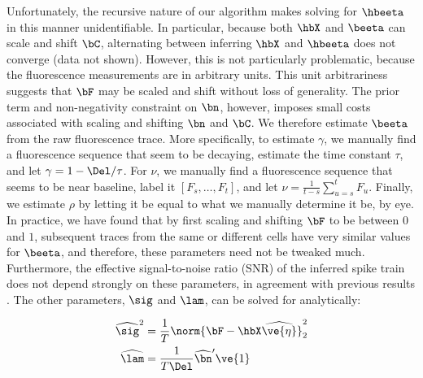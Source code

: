 Unfortunately, the recursive nature of our algorithm makes solving for $\hbeeta$ in this manner unidentifiable. In particular, because both $\hbX$ and $\beeta$ can scale and shift $\bC$, alternating between inferring $\hbX$ and $\hbeeta$ does not converge (data not shown). However, this is not particularly problematic, because the fluorescence measurements are in arbitrary units. This unit arbitrariness suggests that $\bF$ may be scaled and shift without loss of generality. The prior term and non-negativity constraint on $\bn$, however, imposes small costs associated with scaling and shifting $\bn$ and $\bC$.  We therefore estimate $\beeta$ from the raw fluorescence trace.  More specifically, to estimate $\gamma$, we manually find a fluorescence sequence that seem to be decaying, estimate the time constant $\tau$, and let $\gamma=1-\Del/\tau$.  For $\nu$, we manually find a fluorescence sequence that seems to be near baseline, label it $[F_s,\ldots, F_t]$, and let $\nu=\frac{1}{t-s}\sum_{u=s}^t F_u$.  Finally, we estimate $\rho$ by letting it be equal to what we manually determine it be, by eye.  In practice, we have found that by first scaling and shifting $\bF$ to be between $0$ and $1$, subsequent traces from the same or different cells have very similar values for $\beeta$, and therefore, these parameters need not be tweaked much.  Furthermore, the effective signal-to-noise ratio (SNR) of the inferred spike train does not depend strongly on these parameters, in agreement with previous results \cite{YaksiFriedrich06}.  The other parameters, $\sig$ and $\lam$, can be solved for analytically:

\begin{align} 
\widehat{\sig}^2 &= \frac{1}{T} \norm{\bF - \hbX \widehat{\ve{\eta}}}_2^2 \label{eq:sig2}\\
\widehat{\lam} &=  \frac{1}{T \Del} \hnm' \ve{1} \label{eq:lam}
\end{align}


